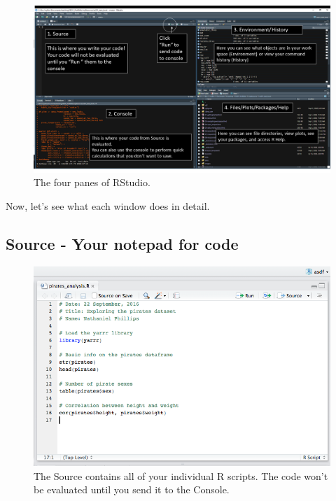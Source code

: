 \documentclass[
]{book}
\begin{document}
\begin{figure}

{\centering \includegraphics[width=1\linewidth]{images/chapter-1/RStudio_Screenshot_Labels} 

}

\caption{The four panes of RStudio.}\label{fig:rstudiowindows}
\end{figure}

Now, let's see what each window does in detail.

\hypertarget{source---your-notepad-for-code}{%
\subsection{Source - Your notepad for code}\label{source---your-notepad-for-code}}

\begin{figure}

{\centering \includegraphics[width=1\linewidth]{images/chapter-1/piratesanalysisss} 

}

\caption{The Source contains all of your individual R scripts. The code won't be evaluated until you send it to the Console.}\label{fig:sourcewindow}
\end{figure}
\end{document}
